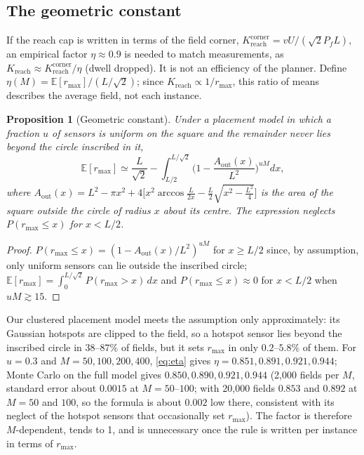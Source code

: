 \documentclass[journal,outdir=./]{IEEEtran}
\newtheorem{proposition}{Proposition}
\newcommand{\Kr}{K_{\mathrm{reach}}}
\newcommand{\rmax}{r_{\max}}
\newcommand{\Pf}{P_{f}}
\begin{document}
\subsection{The geometric constant}\label{sec:law:eta}
If the reach cap is written in terms of the field corner, $\Kr^{\mathrm{corner}}=vU/(\sqrt2\Pf L)$, an empirical factor $\eta\approx0.9$ is needed to match measurements, as $\Kr\approx\Kr^{\mathrm{corner}}/\eta$ (dwell dropped). It is not an efficiency of the planner. Define $\eta(M)=\mathbb{E}[\rmax]/(L/\sqrt2)$; since $\Kr\propto1/\rmax$, this ratio of means describes the average field, not each instance.
\begin{proposition}[Geometric constant]\label{prop:eta}
Under a placement model in which a fraction $u$ of sensors is uniform on the square and the remainder never lies beyond the circle inscribed in it,
\begin{equation}\label{eq:eta}
\mathbb{E}[\rmax]\simeq\frac{L}{\sqrt2}-\int_{L/2}^{L/\sqrt2}\Big(1-\frac{A_{\mathrm{out}}(x)}{L^2}\Big)^{uM}dx,
\end{equation}
where $A_{\mathrm{out}}(x)=L^2-\pi x^2+4\big[x^2\arccos\frac{L}{2x}-\frac{L}{2}\sqrt{x^2-\frac{L^2}{4}}\big]$ is the area of the square outside the circle of radius $x$ about its centre. The expression neglects $P(\rmax\le x)$ for $x<L/2$.
\end{proposition}
\begin{proof}
$P(\rmax\le x)=(1-A_{\mathrm{out}}(x)/L^2)^{uM}$ for $x\ge L/2$ since, by assumption, only uniform sensors can lie outside the inscribed circle; $\mathbb{E}[\rmax]=\int_0^{L/\sqrt2}P(\rmax>x)\,dx$ and $P(\rmax\le x)\approx0$ for $x<L/2$ when $uM\gtrsim15$.
\end{proof}
Our clustered placement model meets the assumption only approximately: its Gaussian hotspots are clipped to the field, so a hotspot sensor lies beyond the inscribed circle in $38$--$87\%$ of fields, but it sets $\rmax$ in only $0.2$--$5.8\%$ of them. For $u=0.3$ and $M=50,100,200,400$, \eqref{eq:eta} gives $\eta=0.851,0.891,0.921,0.944$; Monte Carlo on the full model gives $0.850,0.890,0.921,0.944$ (2{,}000 fields per $M$, standard error about $0.0015$ at $M=50$--$100$; with 20{,}000 fields $0.853$ and $0.892$ at $M=50$ and $100$, so the formula is about $0.002$ low there, consistent with its neglect of the hotspot sensors that occasionally set $\rmax$). The factor is therefore $M$-dependent, tends to 1, and is unnecessary once the rule is written per instance in terms of $\rmax$.
\end{document}
